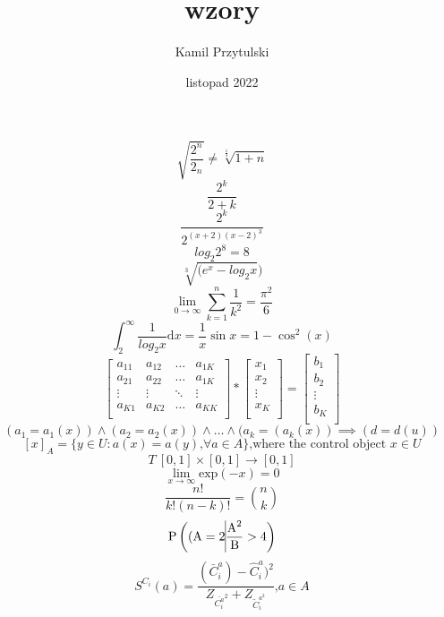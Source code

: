 \documentclass[12pt; a4paper; titlepage]{article}
\title{wzory}
\author{Kamil Przytulski}
\date {listopad 2022}
\begin{document}
$$ \sqrt{ \frac{2^{n}}{2_n}}\neq \sqrt[\frac{1}{3}]{1+n} $$
\newline
$$ \frac{2^{k}}{2+k}$$
\newline
$$ \frac{2^{k}}{2^{(x+2)(x-2)^{3}}}$$
\newline
$$ log_2 2^{8}=8$$
\newline
$$\sqrt[3]{(e^{x}-log_2 x})$$
\newline
$$\lim_{0\to\infty} \sum_{k=1}^{n}\frac{1}{k^2}=\frac{\pi^2}{6}$$
\newline 
$$ \int^{\infty}_{2} \frac{1}{log_{2}x}\mathrm{d}x = \frac{1}{x}\sin x=1-\cos^{2} (x) $$ 
\newline
$$
\left[ \begin{array}{cccc}
a_{11} & a_{12} & \ldots & a_{1K}\\
a_{21} & a_{22} & \ldots & a_{1K}\\
\vdots & \vdots & \ddots & \vdots\\
a_{K1} & a_{K2} & \ldots & a_{KK}\\
\end{array} \right] * 
\left[ \begin{array}{c}
x_{1} \\
x_{2} \\
\vdots \\
x_{K} \\
\end{array} \right] = 
\left[ \begin{array}{c}
b_{1} \\
b_{2} \\
\vdots \\
b_{K} \\
\end{array} \right] $$
\newline
$$(a_{1}=a_{1}(x)) \land (a_{2}=a_{2}(x))\land \ldots \land	(a_{k}=(a_{k}(x)) \implies (d=d(u))$$
\newline
$$ [x]_{A}= \{ y\in U : a(x) = a (y)\textrm{,} \forall a \in A\}\textrm{,where the control object } x\in U$$ 
\newline
$$ T\:[0,1] \times [0,1] \to [0,1]$$
\newline
$$\lim_{x\to\infty} \textrm{exp}(-x)=0$$
\newline
$$\frac{n!}{k!(n-k)!}= {n \choose k}$$
\newline
$$ \textrm{P} \left(( \textrm{A} = 2 \vline \frac{\textrm{A}^2}{\textrm{B}}>4 \right)$$
\newline
$$ S^{C_{i}}(a)=\frac{(\bar{C}^{a}_{i})-\hat{C}^{a}_{i})^2}{Z_{\bar{C^{a}_{i}}^2}+Z_{\tilde{C}^{a^2}_{i}}}\textrm{,} a\in A$$
\end{document}
